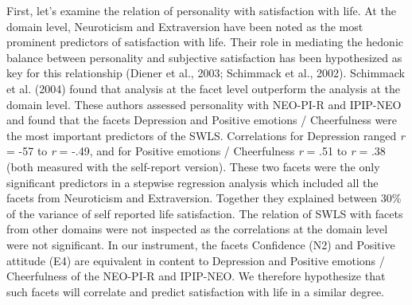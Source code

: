 \documentclass[,man,floatsintext]{apa6}
\theoremstyle{definition}
\theoremstyle{definition}
\theoremstyle{definition}
\theoremstyle{remark}
\begin{document}
First, let's examine the relation of personality with satisfaction with
life. At the domain level, Neuroticism and Extraversion have been noted
as the most prominent predictors of satisfaction with life. Their role
in mediating the hedonic balance between personality and subjective
satisfaction has been hypothesized as key for this relationship (Diener
et al., 2003; Schimmack et al., 2002). Schimmack et al. (2004) found
that analysis at the facet level outperform the analysis at the domain
level. These authors assessed personality with NEO-PI-R and IPIP-NEO and
found that the facets Depression and Positive emotions / Cheerfulness
were the most important predictors of the SWLS. Correlations for
Depression ranged \emph{r} = -57 to \emph{r} = -.49, and for Positive
emotions / Cheerfulness \emph{r} = .51 to \emph{r} = .38 (both measured
with the self-report version). These two facets were the only
significant predictors in a stepwise regression analysis which included
all the facets from Neuroticism and Extraversion. Together they
explained between 30\% of the variance of self reported life
satisfaction. The relation of SWLS with facets from other domains were
not inspected as the correlations at the domain level were not
significant. In our instrument, the facets Confidence (N2) and Positive
attitude (E4) are equivalent in content to Depression and Positive
emotions / Cheerfulness of the NEO-PI-R and IPIP-NEO. We therefore
hypothesize that such facets will correlate and predict satisfaction
with life in a similar degree.
\end{document}
